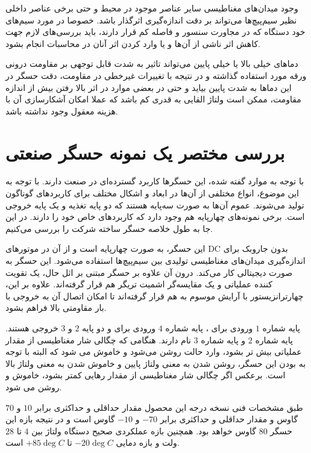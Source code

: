 \documentclass[conference]{IEEEtran-ModifiedForMVIP}
\begin{document}
 وجود میدان‌های مغناطیسی سایر عناصر موجود در محیط و حتی برخی عناصر داخلی نظیر سیم‌پیچ‌ها می‌تواند بر دقت اندازه‌گیری اثرگذار باشد. خصوصا در مورد سیم‌های خود دستگاه که در مجاورت سنسور و فاصله کم قرار دارند، باید بررسی‌های لازم جهت کاهش اثر ناشی از آن‌ها و یا وارد کردن اثر آنان در محاسبات انجام بشود. \cite{ratna}
 
 دماهای خیلی بالا یا خیلی پایین می‌تواند تاثیر به شدت قابل توجهی بر مقاومت درونی ورقه مورد استفاده گذاشته \cite{ratna} و در نتیجه با تغییرات غیرخطی در مقاومت، دقت حسگر در این دماها به شدت پایین بیاید و حتی در بعضی موارد در اثر بالا رفتن بیش از اندازه مقاومت،‌ ممکن است ولتاژ القایی به قدری کم باشد که عملا امکان آشکارسازی آن با هزینه معقول وجود نداشته باشد.
 
\section{بررسی مختصر یک نمونه‌ حسگر  صنعتی}

با توجه به موارد گفته شده، این حسگرها کاربرد گسترده‌ای در صنعت دارند. با توجه به این موضوع، انواع مختلفی از آن‌ها در ابعاد و اشکال مختلف برای کاربردهای گوناگون تولید می‌شوند. عموم آن‌ها به صورت سه‌پایه هستند که دو پایه تغذیه و یک پایه خروجی است. برخی نمونه‌های چهارپایه هم وجود دارد که کاربردهای خاص خود را دارند. در این جا به طول خلاصه حسگر   ساخته شرکت  را بررسی می‌کنیم.

این حسگر، به صورت چهارپایه است و از آن در موتورهای DC بدون جاروبک برای اندازه‌گیری میدان‌های مغناطیسی تولیدی بین سیم‌پیچ‌ها استفاده می‌شود. این حسگر به صورت دیجیتالی کار می‌کند. درون آن علاوه بر حسگر مبتنی بر اثل حال، یک تقویت کننده عملیاتی و یک مقایسه‌گر اشمیت تریگر هم قرار گرفته‌اند. علاوه بر این، چهارترانزیستور  با آرایش موسوم به  هم قرار گرفته‌اند تا امکان اتصال آن به خروجی با بار مقاومتی بالا فراهم بشود. 

پایه شماره $1$ ورودی برای ، پایه شماره $4$ ورودی برای  و دو پایه $2$ و $3$ خروجی هستند. پایه شماره $2$  و پایه شماره $3$  نام دارند. هنگامی که چگالی شار مغناطیسی از مقدار عملیاتی  بیش تر بشود،  وارد حالت روشن می‌شود و  خاموش می شود که البته با توجه به  بودن این حسگر، روشن شدن به معنی ولتاژ پایین و خاموش شدن به معنی ولتاژ بالا است. برعکس اگر چگالی شار مغناطیسی از مقدار رهایی  کمتر بشود،  خاموش و  روشن می شود.

طبق مشخصات فنی نسخه درجه  این محصول مقدار حداقلی و حداکثری  برابر $10$ و $70$ گاوس و مقدار حداقلی و حداکثری  برابر $-70$ و $-10$ گاوس است و در نتیجه بازه  این حسگر $80$ گاوس خواهد بود. همچنین بازه عملکردی صحیح دستگاه ولتاژ بین $4$ تا $28$ ولت و بازه دمایی $-20\deg C$ تا $+85\deg C$ است. \cite{ah266}
\end{document}
